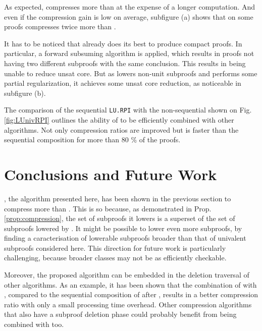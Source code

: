 \documentclass{llncs}
\begin{document}


As expected, {\LowerUnivalents} compresses more than {\LowerUnits} at the expense of a longer
computation. And even if the compression gain is low on average, subfigure (a) shows that
on some proofs {\LowerUnivalents} compresses twice more than {\LowerUnits}.

It has to be noticed that \veriT already does its best to produce compact proofs. In particular,
a forward subsuming algorithm is applied, which results in proofs not having two different subproofs
with the same conclusion. This results in {\LowerUnits} being unable to reduce unsat core.
But as {\LowerUnivalents} lowers non-unit subproofs and performs some partial regularization, it
achieves some unsat core reduction, as noticeable in subfigure (b).

The comparison of the sequential \texttt{LU.RPI} with the non-sequential {\LUnivRPI} shown on Fig.
\ref{fig:LUnivRPI} outlines the ability of {\LowerUnivalents} to be efficiently combined with other
algorithms. Not only compression ratios are improved but {\LUnivRPI} is faster than the sequential
composition for more than 80 \% of the proofs.







%

%

\section{Conclusions and Future Work}

{\LowerUnivalents}, the algorithm presented here, has been shown in the previous section to compress
more than {\LowerUnits}. This is so because, as demonstrated in Prop. \ref{prop:compression}, the
set of subproofs it lowers is a superset of the set of subproofs lowered by {\LowerUnits}. It might
be possible to lower even more subproofs, by finding a caracterisation of lowerable subproofs
broader than that of univalent subproofs considered here. This direction for future work is
particularly challenging, because broader classes may not be as efficiently checkable.

Moreover, the proposed algorithm can be embedded in the deletion traversal of other algorithms.  As
an example, it has been shown that the combination of {\LowerUnivalents} with {\RPI}, compared to
the sequential composition of {\LowerUnits} after {\RPI}, results in a better compression ratio with
only a small processing time overhead. Other compression algorithms that also have a subproof
deletion phase could probably benefit from being combined with {\LowerUnivalents} too.
\end{document}
